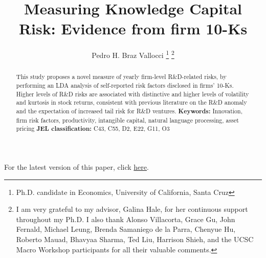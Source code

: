 \documentclass[12pt, letterpaper]{article}
\begin{document}
\title{Measuring Knowledge Capital Risk: Evidence from firm 10-Ks}
\author{Pedro H. Braz Vallocci \footnote{Ph.D. candidate in Economics, University of California, Santa Cruz} 
\footnote{I am very grateful to my advisor, Galina Hale, for her continuous support throughout my Ph.D. I also thank Alonso Villacorta, Grace Gu, John Fernald, Michael Leung, Brenda Samaniego de la Parra, Chenyue Hu, Roberto Mauad, Bhavyaa Sharma, Ted Liu, Harrison Shieh, and the UCSC Macro Workshop participants for all their valuable comments.}} %

\newcommand{\ffo}{dicfullmc10thr10defnob40noa1_4t}

\newcommand{\insertfigure}[3]{
\begin{figure}[H]
  \centering
  \texttt{[image: \\ffo/\#1]}
  \caption{#2}
  \label{fig:#1}
\end{figure}
}


\newcommand{\tkk}{$Topic_{kk}$ }

\maketitle 

\begin{center}
For the latest version of this paper, click \href{https://github.com/pbrazval/jmdocs/blob/main/brazvallocci_jmp.pdf}{here}.
\end{center}

\begin{abstract}
    This study proposes a novel measure of yearly firm-level R\&D-related risks, by performing an LDA analysis of self-reported risk factors disclosed in firms' 10-Ks.  Higher levels of R\&D risks are associated with distinctive and higher levels of volatility and kurtosis in stock returns, consistent with previous literature on the R\&D anomaly and the expectation of increased tail risk for R\&D ventures. \newline \textbf{\indent Keywords:} Innovation, firm risk factors, productivity, intangible capital, natural language processing, asset pricing \newline \textbf{\indent JEL classification:} C43, C55, D2, E22, G11, O3
\end{abstract}
\end{document}
